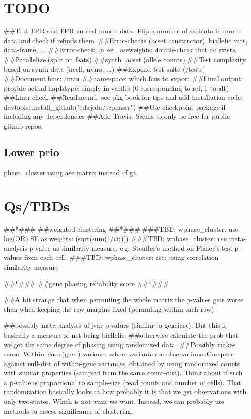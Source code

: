 

\section{TODO}
##Test TPR and FPR on real mouse data. Flip a number of variants in mouse data and check if refinds them.
##Error-checks (acset constructor). biallelic vars, data-frame, ...
##Error-check: In set_aseweights: double-check that ac exists.
##Parallelize (split on feats)
##synth_acset (allele counts)
##Test complexity based on synth data (ncell, nvars, ...)
##Expand test-suite (/tests)
##Document fcns: /man
##namespace: which fcns to export
##Final output: provide actual haplotype: simply in varflip (0 corresponding to ref, 1 to alt)
##Lintr check
##Readme.md: see pkg book for tips and add installation code: devtools::install_github("edajeda/scphaser")
##Use checkpoint package if including any dependencies
##Add Travis. Seems to only be free for public github repos.

\subsection{Lower prio}
phase_cluster using ase matrix instead of gt.

\section{Qs/TBDs}

##*###
##weighted clustering
##*###
###TBD: wphase_cluster: use log(OR) SE as weights: (sqrt(sum(1/cij)))
###TBD: wphase_cluster: use meta-analysis p-value as similarity measure, e.g. Stouffer's method on Fisher's test p-values from each cell.
###TBD: wphase_cluster: ase: using correlation similarity measure

##*###
##gene phasing reliability score
##*###

##A bit strange that when permuting the whole matrix the p-values gets worse than when keeping the row-margins fixed (permuting within each row).

##possibly meta-analysis of jvar p-values (similar to geneiase). But
this is basically a measure of not being biallelic.
##otherwise calculate the prob that we get the same degree of phasing using randomized data.
##Possibly makes sense: Within-class (gene) variance where variants are observations. Compare
against null-dist of within-gene variances, obtained by using randomized counts with similar properties
(sampled from the same count-dist). Think about if such a p-value is
proportional to sample-size (read counts and number of cells).
That randomization basically looks at how probably it is that we get
observations with only two-states. Which is not want we want. Instead,
we can probably use methods to assess significance of clustering.


